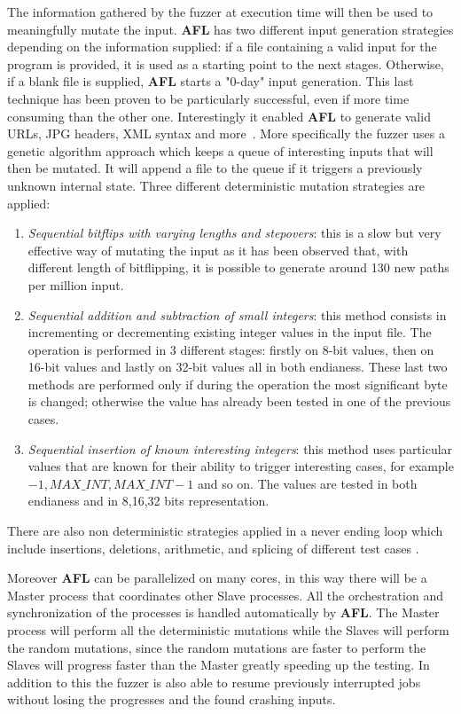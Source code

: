\documentclass[../main.tex]{subfiles}
\begin{document}
The information gathered by the fuzzer at execution time will then be used to meaningfully mutate the input. \textbf{AFL} has two different input generation strategies depending on the information supplied: if a file containing a valid input for the program is provided, it is used as a starting point to the next stages. Otherwise, if a blank file is supplied, \textbf{AFL} starts a "0-day" input generation. This last technique has been proven to be particularly successful, even if more time consuming than the other one. Interestingly it enabled \textbf{AFL} to generate valid URLs, JPG headers, XML syntax and more~\cite{aflblog}. More specifically the fuzzer uses a genetic algorithm approach which keeps a queue of interesting inputs that will then be mutated. It will append a file to the queue if it triggers a previously unknown internal state. Three different deterministic mutation strategies are applied:
\begin{enumerate}
  \item \textit{Sequential bitflips with varying lengths and stepovers}: this is a slow but very effective way of mutating the input as it has been observed that, with different length of bitflipping, it is possible to generate around 130 new paths per million input.
  \item \textit{Sequential addition and subtraction of small integers}: this method consists in incrementing or decrementing existing integer values in the input file. The operation is performed in 3 different stages: firstly on 8-bit values, then on 16-bit values and lastly on 32-bit values all in both endianess. These last two methods are performed only if during the operation the most significant byte is changed; otherwise the value has already been tested in one of the previous cases.
  \item \textit{Sequential insertion of known interesting integers}: this method uses particular values that are known for their ability to trigger interesting cases, for example $-1, MAX\_INT, MAX\_INT-1$ and so on. The values are tested in both endianess and in 8,16,32 bits representation.
\end{enumerate}

There are also non deterministic strategies applied in a never ending loop which include insertions, deletions, arithmetic, and splicing of different test cases \cite{afltech}.

Moreover \textbf{AFL} can be parallelized on many cores, in this way there will be a Master process that coordinates other Slave processes. All the orchestration and synchronization of the processes is handled automatically by \textbf{AFL}. The Master process will perform all the deterministic mutations while the Slaves will perform the random mutations, since the random mutations are faster to perform the Slaves will progress faster than the Master greatly speeding up the testing. In addition to this the fuzzer is also able to resume previously interrupted jobs without losing the progresses and the found crashing inputs.
\end{document}

